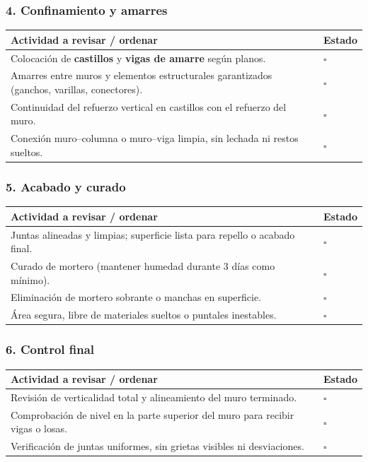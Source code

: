 \documentclass[12pt]{article}
\newcommand{\cbox}{\(\square\)} %
\begin{document}
	\subsubsection*{4. Confinamiento y amarres}
	\begin{tabularx}{\linewidth}{>{\raggedright\arraybackslash}p{0.93\linewidth} >{\centering\arraybackslash}m{0.07\linewidth}}
		\toprule
		\textbf{Actividad a revisar / ordenar} & \textbf{Estado}\\
		\midrule
		Colocación de \textbf{castillos} y \textbf{vigas de amarre} según planos. & \cbox \\
		Amarres entre muros y elementos estructurales garantizados (ganchos, varillas, conectores). & \cbox \\
		Continuidad del refuerzo vertical en castillos con el refuerzo del muro. & \cbox \\
		Conexión muro–columna o muro–viga limpia, sin lechada ni restos sueltos. & \cbox \\
		\bottomrule
	\end{tabularx}
	
	\subsubsection*{5. Acabado y curado}
	\begin{tabularx}{\linewidth}{>{\raggedright\arraybackslash}p{0.93\linewidth} >{\centering\arraybackslash}m{0.07\linewidth}}
		\toprule
		\textbf{Actividad a revisar / ordenar} & \textbf{Estado}\\
		\midrule
		Juntas alineadas y limpias; superficie lista para repello o acabado final. & \cbox \\
		Curado de mortero (mantener humedad durante 3 días como mínimo). & \cbox \\
		Eliminación de mortero sobrante o manchas en superficie. & \cbox \\
		Área segura, libre de materiales sueltos o puntales inestables. & \cbox \\
		\bottomrule
	\end{tabularx}
	
	\subsubsection*{6. Control final}
	\begin{tabularx}{\linewidth}{>{\raggedright\arraybackslash}p{0.93\linewidth} >{\centering\arraybackslash}m{0.07\linewidth}}
		\toprule
		\textbf{Actividad a revisar / ordenar} & \textbf{Estado}\\
		\midrule
		Revisión de verticalidad total y alineamiento del muro terminado. & \cbox \\
		Comprobación de nivel en la parte superior del muro para recibir vigas o losas. & \cbox \\
		Verificación de juntas uniformes, sin grietas visibles ni desviaciones. & \cbox \\
		\bottomrule
	\end{tabularx}
	
\end{document}
